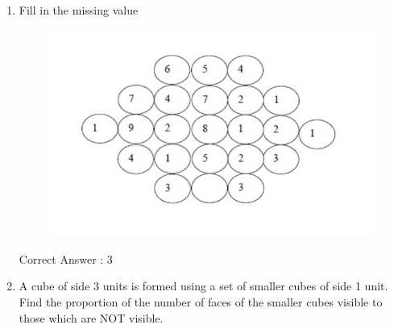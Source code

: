 \documentclass[journal,12pt,onecolumn]{exam}
\theoremstyle{remark}
\newcommand{\cross}{\textcolor{wrongred}{\ding{55}}}
\newcommand{\tick}{\textcolor{correctgreen}{\ding{51}}}
\begin{document}
\begin{enumerate}
\begin{multicols}{4}
 \begin{enumerate}
    \item \textcolor{wrongred}{\cross\ Human progress and security are positively associated with environmental security.}
    \item \textcolor{correctgreen}{\tick\ Human progress is contradictory to environmental security.}
    \item \textcolor{wrongred}{\cross\ Human security is contradictory to environmental security.}
    \item \textcolor{wrongred}{\cross\ Human progress depends upon environmental security.}
\end{enumerate}
\end{multicols}

 

\item

Fill in the missing value

 

\begin{figure}
    \centering
    \includegraphics[width=\textwidth]{figs/image1.png}
    \caption{}
    \label{fig:figure1}
\end{figure}

 

Correct Answer : \textcolor{correctgreen}{3}

 

\item

A cube of side 3 units is formed using a set of smaller cubes of side 1 unit. Find the proportion of the number of faces of the smaller cubes visible to those which are NOT visible.


\end{enumerate}
\end{document}
